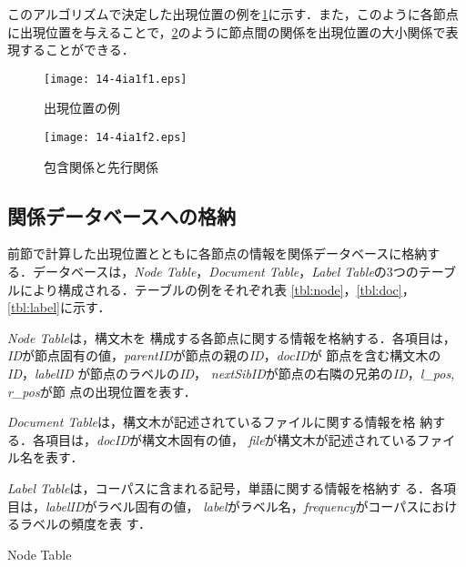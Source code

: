 \documentclass[japanese]{jnlp_1.3e}
\begin{document}
このアルゴリズムで決定した出現位置の例を\figurename\ref{fig:tree-yoshikawa}に示す．また，このように各節点に出現位置を与えることで，\figurename\ref{fig:yoshikawa-hougan}のように節点間の関係を出現位置の大小関係で表現することができる．

\begin{figure}[t]
  \begin{center}
\texttt{[image: 14-4ia1f1.eps]}
    \caption{出現位置の例}
    \label{fig:tree-yoshikawa}
  \end{center}
\end{figure}

\begin{figure}[t]
  \begin{center}
\texttt{[image: 14-4ia1f2.eps]}
    \caption{包含関係と先行関係}
    \label{fig:yoshikawa-hougan}
  \end{center}
\end{figure}



\subsection{関係データベースへの格納}

前節で計算した出現位置とともに各節点の情報を関係データベースに格納す
る．データベースは，{\it Node Table}，{\it Document Table}，{\it Label
  Table}の3つのテーブルにより構成される．テーブルの例をそれぞれ表
\ref{tbl:node}，\ref{tbl:doc}，\ref{tbl:label}に示す．

{\it Node Table}は，構文木を
構成する各節点に関する情報を格納する．各項目は，{\it
  ID}が節点固有の値，{\it parentID}が節点の親の{\it ID}，{\it docID}が
節点を含む構文木の{\it ID}，{\it labelID }が節点のラベルの{\it ID}，
{\it nextSibID}が節点の右隣の兄弟の{\it ID}，{\it l\_pos, r\_pos}が節
点の出現位置を表す．

{\it Document Table}は，構文木が記述されているファイルに関する情報を格
納する．各項目は，{\it docID}が構文木固有の値，{\it
  file}が構文木が記述されているファイル名を表す．

{\it Label Table}は，コーパスに含まれる記号，単語に関する情報を格納す
る．各項目は，{\it labelID}がラベル固有の値，{\it
  label}がラベル名，{\it frequency}がコーパスにおけるラベルの頻度を表
す．

\begin{table}[t]
\caption{Node Table}

\end{table}

\begin{table}[t]

\end{table}
\end{document}
